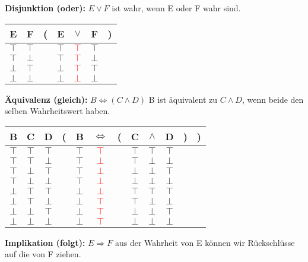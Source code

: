 \documentclass[pdftex,12pt,a4paper,fleqn]{scrartcl}
\begin{document}
\textbf{Disjunktion (oder):}
$E \lor F$ ist wahr, wenn E oder F wahr sind.

\begin{tabular}{@{ }c@{ }@{ }c | c@{}@{ }c@{ }@{ }c@{ }@{ }c@{ }@{}c@{ }}
E & F & ( & E & $\lor$ & F & )\\
\hline 
$\top$ & $\top$ &  & $\top$ & \textcolor{red}{$\top$} & $\top$ & \\
$\top$ & $\bot$ &  & $\top$ & \textcolor{red}{$\top$} & $\bot$ & \\
$\bot$ & $\top$ &  & $\bot$ & \textcolor{red}{$\top$} & $\top$ & \\
$\bot$ & $\bot$ &  & $\bot$ & \textcolor{red}{$\bot$} & $\bot$ & \\
\end{tabular}

\textbf{Äquivalenz (gleich):}
$B \Leftrightarrow (C \land D)$ B ist äquivalent zu $C \land D$, wenn beide den selben Wahrheitswert haben.

\begin{tabular}{@{ }c@{ }@{ }c@{ }@{ }c | c@{}@{ }c@{ }@{ }c@{ }@{}c@{}@{ }c@{ }@{ }c@{ }@{ }c@{ }@{}c@{}@{}c@{ }}
B & C & D & ( & B & $\Leftrightarrow$ & ( & C & $\land$ & D & ) & )\\
\hline 
$\top$ & $\top$ & $\top$ &  & $\top$ & \textcolor{red}{$\top$} &  & $\top$ & $\top$ & $\top$ &  & \\
$\top$ & $\top$ & $\bot$ &  & $\top$ & \textcolor{red}{$\bot$} &  & $\top$ & $\bot$ & $\bot$ &  & \\
$\top$ & $\bot$ & $\top$ &  & $\top$ & \textcolor{red}{$\bot$} &  & $\bot$ & $\bot$ & $\top$ &  & \\
$\top$ & $\bot$ & $\bot$ &  & $\top$ & \textcolor{red}{$\bot$} &  & $\bot$ & $\bot$ & $\bot$ &  & \\
$\bot$ & $\top$ & $\top$ &  & $\bot$ & \textcolor{red}{$\bot$} &  & $\top$ & $\top$ & $\top$ &  & \\
$\bot$ & $\top$ & $\bot$ &  & $\bot$ & \textcolor{red}{$\top$} &  & $\top$ & $\bot$ & $\bot$ &  & \\
$\bot$ & $\bot$ & $\top$ &  & $\bot$ & \textcolor{red}{$\top$} &  & $\bot$ & $\bot$ & $\top$ &  & \\
$\bot$ & $\bot$ & $\bot$ &  & $\bot$ & \textcolor{red}{$\top$} &  & $\bot$ & $\bot$ & $\bot$ &  & \\
\end{tabular}

\textbf{Implikation (folgt):}
$E \Rightarrow F$ aus der Wahrheit von E können wir Rückschlüsse auf die von F ziehen.
\end{document}
